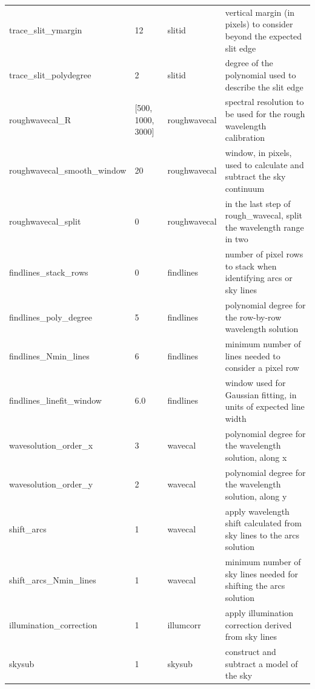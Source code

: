 \documentclass[a4paper]{article}
\begin{document}
\begin{sloppypar}
\begin{table}
{\begin{tabular}{llll}
    trace\_slit\_ymargin          & 12            & slitid           & vertical margin (in pixels) to consider beyond the expected slit edge \\
    trace\_slit\_polydegree       & 2             & slitid           & degree of the polynomial used to describe the slit edge \\
    roughwavecal\_R               & [500, 1000, 3000] & roughwavecal & spectral resolution to be used for the rough wavelength calibration \\
    roughwavecal\_smooth\_window  & 20            & roughwavecal     & window, in pixels, used to calculate and subtract the sky continuum \\
    roughwavecal\_split           & 0             & roughwavecal     & in the last step of rough\_wavecal, split the wavelength range in two \\
    findlines\_stack\_rows        & 0             & findlines        & number of pixel rows to stack when identifying arcs or sky lines \\
    findlines\_poly\_degree       & 5             & findlines        & polynomial degree for the row-by-row wavelength solution \\
    findlines\_Nmin\_lines        & 6             & findlines        & minimum number of lines needed to consider a pixel row \\
    findlines\_linefit\_window    & 6.0           & findlines        & window used for Gaussian fitting, in units of expected line width \\
    wavesolution\_order\_x        & 3             & wavecal          & polynomial degree for the wavelength solution, along x \\
    wavesolution\_order\_y        & 2             & wavecal          & polynomial degree for the wavelength solution, along y \\
    shift\_arcs                   & 1             & wavecal          & apply wavelength shift calculated from sky lines to the arcs solution \\
    shift\_arcs\_Nmin\_lines      & 1             & wavecal          & minimum number of sky lines needed for shifting the arcs solution \\
    illumination\_correction      & 1             & illumcorr        & apply illumination correction derived from sky lines \\
    skysub                        & 1             & skysub           & construct and subtract a model of the sky \\

\end{tabular}}
\end{table}
\end{sloppypar}
\end{document}
